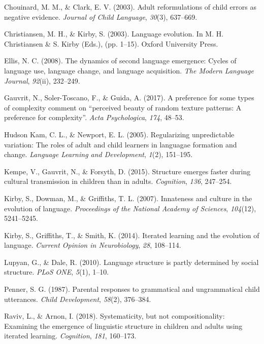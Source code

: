 \documentclass[10pt, letterpaper]{article}
\begin{document}
\hypertarget{ref-chouinard-2003}{}
Chouinard, M. M., \& Clark, E. V. (2003). Adult reformulations of child
errors as negative evidence. \emph{Journal of Child Language},
\emph{30}(3), 637--669.

\hypertarget{ref-christiansen-2003}{}
Christiansen, M. H., \& Kirby, S. (2003). Language evolution. In M. H.
Christiansen \& S. Kirby (Eds.), (pp. 1--15). Oxford University Press.

\hypertarget{ref-ellis-2008}{}
Ellis, N. C. (2008). The dynamics of second language emergence: Cycles
of language use, language change, and language acquisition. \emph{The
Modern Language Journal}, \emph{92}(ii), 232--249.

\hypertarget{ref-gauvrit-2017}{}
Gauvrit, N., Soler-Toscano, F., \& Guida, A. (2017). A preference for
some types of complexity comment on ``perceived beauty of random texture
patterns: A preference for complexity''. \emph{Acta Psychologica},
\emph{174}, 48--53.

\hypertarget{ref-hudsonkam-2005}{}
Hudson Kam, C. L., \& Newport, E. L. (2005). Regularizing unpredictable
variation: The roles of adult and child learners in languagae formation
and change. \emph{Language Learning and Development}, \emph{1}(2),
151--195.

\hypertarget{ref-kempe-2015}{}
Kempe, V., Gauvrit, N., \& Forsyth, D. (2015). Structure emerges faster
during cultural transmission in children than in adults.
\emph{Cognition}, \emph{136}, 247--254.

\hypertarget{ref-kirby-2007}{}
Kirby, S., Dowman, M., \& Griffiths, T. L. (2007). Innateness and
culture in the evolution of language. \emph{Proceedings of the National
Academy of Sciences}, \emph{104}(12), 5241--5245.

\hypertarget{ref-kirby-2014}{}
Kirby, S., Griffiths, T., \& Smith, K. (2014). Iterated learning and the
evolution of language. \emph{Current Opinion in Neurobiology},
\emph{28}, 108--114.

\hypertarget{ref-lupyan-2010}{}
Lupyan, G., \& Dale, R. (2010). Language structure is partly determined
by social structure. \emph{PLoS ONE}, \emph{5}(1), 1--10.

\hypertarget{ref-penner-1987}{}
Penner, S. G. (1987). Parental responses to grammatical and
ungrammatical child utterances. \emph{Child Development}, \emph{58}(2),
376--384.

\hypertarget{ref-raviv-2018}{}
Raviv, L., \& Arnon, I. (2018). Systematicity, but not compositionality:
Examining the emergence of linguistic structure in children and adults
using iterated learning. \emph{Cognition}, \emph{181}, 160--173.
\end{document}
